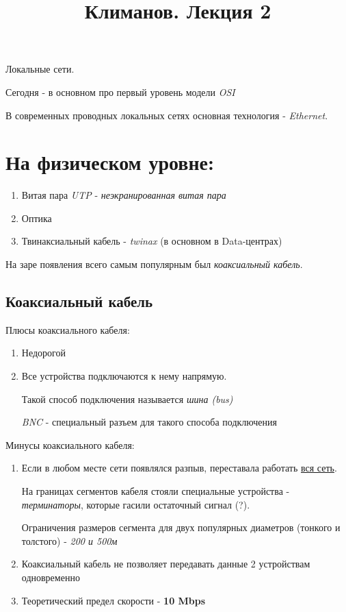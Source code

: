 \documentclass[a4paper,10pt]{article}
\title{Климанов. Лекция 2}
\begin{document}
	\maketitle
	Локальные сети.
	
	Сегодня - в основном про первый уровень модели \emph{OSI}
	
	В современных проводных локальных сетях основная технология - \emph{Ethernet}.
	
	\section{На физическом уровне:}
	\begin{enumerate}
		\item Витая пара \emph{UTP} - \emph{неэкранированная витая пара}
		\item Оптика
		\item Твинаксиальный кабель - \emph{twinax} (в основном в Data-центрах)
	\end{enumerate}
	На заре появления всего самым популярным был \emph{коаксиальный кабель}.
	
	\subsection{Коаксиальный кабель}
	Плюсы коаксиального кабеля:
	\begin{enumerate}
		\item Недорогой
		\item Все устройства подключаются к нему напрямую.
		
		Такой способ подключения называется \emph{шина (bus)}
		
		\emph{BNC} - специальный разъем для такого способа подключения
	\end{enumerate}

	Минусы коаксиального кабеля:
	\begin{enumerate}
		\item Если в любом месте сети появлялся разпыв, переставала работать \underline{вся сеть}.
		
		На границах сегментов кабеля стояли специальные устройства - \emph{терминаторы}, которые гасили остаточный сигнал (?).
		
		Ограничения размеров сегмента для двух популярных диаметров (тонкого и толстого) - \textit{200 и 500м}
		
		\item Коаксиальный кабель не позволяет передавать данные 2 устройствам одновременно
		\item Теоретический предел скорости - \textbf{10 Mbps}
	\end{enumerate}
	
\end{document}
